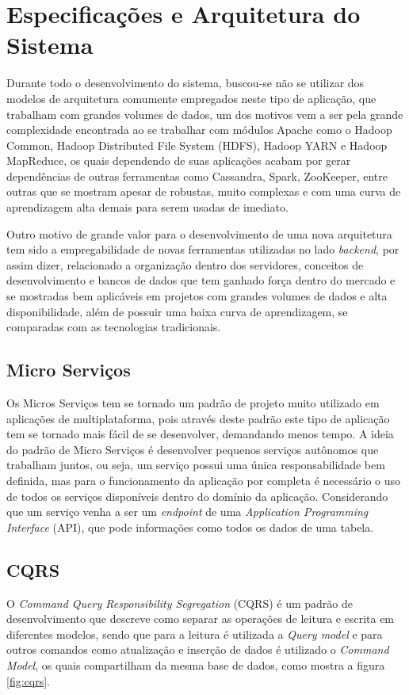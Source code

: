 \chapter{Especificações e Arquitetura do Sistema}
\label{chap:arquitetura}
Durante todo o desenvolvimento do sistema, buscou-se não se utilizar dos modelos de arquitetura comumente empregados neste tipo de aplicação, que trabalham com grandes volumes de dados, um dos motivos vem a ser pela grande complexidade encontrada ao se trabalhar com módulos Apache como o Hadoop Common, Hadoop Distributed File System (HDFS), Hadoop YARN e Hadoop MapReduce, os quais dependendo de suas aplicações acabam por gerar dependências de outras ferramentas como Cassandra, Spark, ZooKeeper, entre outras que se mostram apesar de robustas, muito complexas e com uma curva de aprendizagem alta demais para serem usadas de imediato.

Outro motivo de grande valor para o desenvolvimento de uma nova arquitetura tem sido a empregabilidade de novas ferramentas utilizadas no lado \textit{backend}, por assim dizer, relacionado a organização dentro dos servidores, conceitos de desenvolvimento e bancos de dados que tem ganhado força dentro do mercado e se mostradas bem aplicáveis em projetos com grandes volumes de dados e alta disponibilidade, além de possuir uma baixa curva de aprendizagem, se comparadas com as tecnologias tradicionais.

\section{Micro Serviços}
\label{sec:microserviços}
Os Micros Serviços tem se tornado um padrão de projeto muito utilizado em aplicações de multiplataforma, pois através deste padrão este tipo de aplicação tem se tornado mais fácil de se desenvolver, demandando menos tempo. A ideia do padrão de Micro Serviços é desenvolver pequenos serviços autônomos que trabalham juntos, ou seja, um serviço possui uma única responsabilidade bem definida, mas para o funcionamento da aplicação por completa é necessário o uso de todos os serviços disponíveis dentro do domínio da aplicação. Considerando que um serviço venha a ser um \textit{endpoint} de uma \textit{Application Programming Interface} (API), que pode informações como todos os dados de uma tabela.~\cite{newman2015building}

\section{CQRS}
O \textit{Command Query Responsibility Segregation} (CQRS) é um padrão de desenvolvimento que descreve como separar as operações de leitura e escrita em diferentes modelos, sendo que para a leitura é utilizada a \textit{Query model} e para outros comandos como atualização e inserção de dados é utilizado o \textit{Command Model}, os quais compartilham da mesma base de dados, como mostra a figura \ref{fig:cqrs}.

